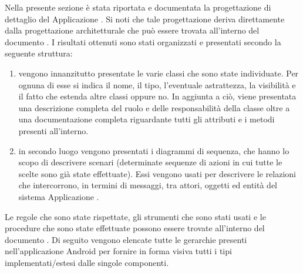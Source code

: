     Nella presente sezione è stata riportata e documentata la progettazione di dettaglio del  Applicazione . Si noti che tale progettazione deriva direttamente dalla progettazione architetturale che può essere trovata all'interno del documento . I risultati ottenuti sono stati organizzati e presentati secondo la seguente struttura:
    \begin{enumerate}
        \item vengono innanzitutto presentate le varie classi che sono state individuate. Per ognuna di esse si indica il nome, il tipo, l'eventuale astrattezza, la visibilità e il fatto che estenda altre classi oppure no. In aggiunta a ciò, viene presentata una descrizione completa del ruolo e delle responsabilità della classe oltre a una documentazione completa riguardante tutti gli attributi e i metodi presenti all'interno.
        \item in secondo luogo vengono presentati i diagrammi di sequenza, che hanno lo scopo di descrivere scenari (determinate sequenze di azioni in cui tutte le scelte sono già state effettuate). Essi vengono usati per descrivere le relazioni che intercorrono, in termini di messaggi, tra attori, oggetti ed entità del sistema Applicazione .
    \end{enumerate}
    Le regole che sono state rispettate, gli strumenti che sono stati usati e le procedure che sono state effettuate possono essere trovate all'interno del documento .
            Di seguito vengono elencate tutte le gerarchie presenti nell'applicazione Android per fornire in forma visiva tutti i tipi implementati/estesi dalle singole componenti.
